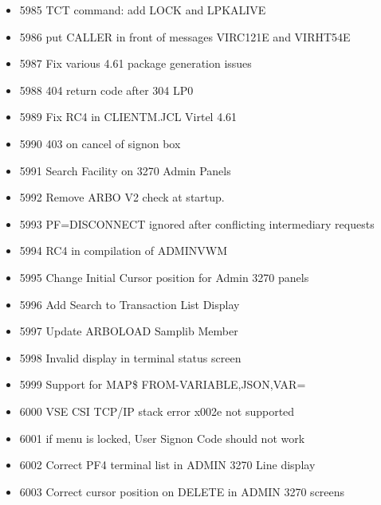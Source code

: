 \documentclass[letterpaper,10pt,english]{sphinxmanual}
\begin{document}
\begin{itemize}
\item {} 
5985 TCT command: add LOCK and LPKALIVE

\item {} 
5986 put CALLER in front of messages VIRC121E and VIRHT54E

\item {} 
5987 Fix various 4.61 package generation issues

\item {} 
5988 404 return code after 304 LP0

\item {} 
5989 Fix RC4 in CLIENTM.JCL Virtel 4.61

\item {} 
5990 403 on cancel of signon box

\item {} 
5991 Search Facility on 3270 Admin Panels

\item {} 
5992 Remove ARBO V2 check at startup.

\item {} 
5993 PF=DISCONNECT ignored after conflicting intermediary requests

\item {} 
5994 RC4 in compilation of ADMINVWM

\item {} 
5995 Change Initial Cursor position for Admin 3270 panels

\item {} 
5996 Add Search to Transaction List Display

\item {} 
5997 Update ARBOLOAD Samplib Member

\item {} 
5998 Invalid display in terminal status screen

\item {} 
5999 Support for MAP\$ FROM-VARIABLE,JSON,VAR=

\item {} 
6000 VSE CSI TCP/IP stack error x002e not supported

\item {} 
6001 if menu is locked, User Signon Code should not work

\item {} 
6002 Correct PF4 terminal list in ADMIN 3270 Line display

\item {} 
6003 Correct cursor position on DELETE in ADMIN 3270 screens


\end{itemize}
\end{document}
